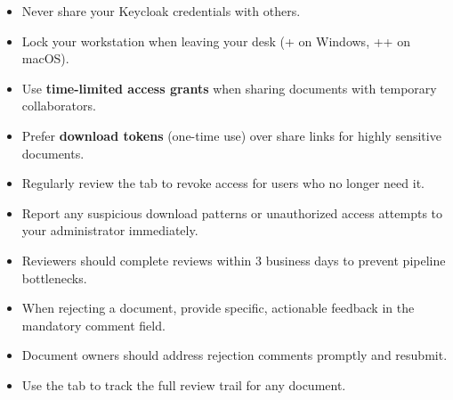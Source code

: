 \vspace{6pt}

\begin{ugBestPractice}
  \begin{itemize}[leftmargin=14pt]
    \item Never share your Keycloak credentials with others.
    \item Lock your workstation when leaving your desk
          (+ on Windows,
           ++ on macOS).
    \item Use \textbf{time-limited access grants} when sharing
          documents with temporary collaborators.
    \item Prefer \textbf{download tokens} (one-time use) over
          share links for highly sensitive documents.
    \item Regularly review the  tab to revoke
          access for users who no longer need it.
    \item Report any suspicious download patterns or
          unauthorized access attempts to your administrator
          immediately.
  \end{itemize}
\end{ugBestPractice}

\vspace{6pt}

\begin{ugBestPractice}
  \begin{itemize}[leftmargin=14pt]
    \item Reviewers should complete reviews within 3 business
          days to prevent pipeline bottlenecks.
    \item When rejecting a document, provide specific,
          actionable feedback in the mandatory comment field.
    \item Document owners should address rejection comments
          promptly and resubmit.
    \item Use the  tab to track the
          full review trail for any document.
  \end{itemize}
\end{ugBestPractice}

\vspace{6pt}

